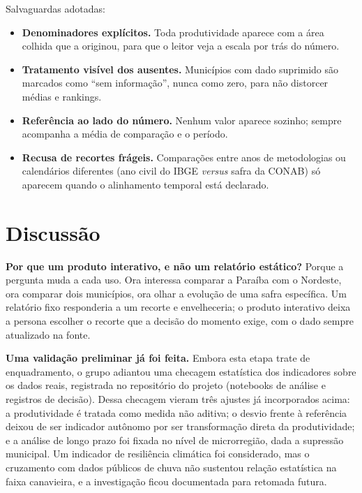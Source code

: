 \documentclass[11pt,a4paper]{article}
\begin{document}
Salvaguardas adotadas:
\begin{itemize}
  \item \textbf{Denominadores explícitos.} Toda produtividade aparece com a área colhida que a
  originou, para que o leitor veja a escala por trás do número.
  \item \textbf{Tratamento visível dos ausentes.} Municípios com dado suprimido são marcados
  como ``sem informação'', nunca como zero, para não distorcer médias e rankings.
  \item \textbf{Referência ao lado do número.} Nenhum valor aparece sozinho; sempre acompanha
  a média de comparação e o período.
  \item \textbf{Recusa de recortes frágeis.} Comparações entre anos de metodologias ou
  calendários diferentes (ano civil do IBGE \textit{versus} safra da CONAB) só aparecem quando
  o alinhamento temporal está declarado.
\end{itemize}

\section{Discussão}

\textbf{Por que um produto interativo, e não um relatório estático?} Porque a pergunta muda a
cada uso. Ora interessa comparar a Paraíba com o Nordeste, ora comparar dois municípios, ora
olhar a evolução de uma safra específica. Um relatório fixo responderia a um recorte e
envelheceria; o produto interativo deixa a persona escolher o recorte que a decisão do momento
exige, com o dado sempre atualizado na fonte.

\textbf{Uma validação preliminar já foi feita.} Embora esta etapa trate de enquadramento, o
grupo adiantou uma checagem estatística dos indicadores sobre os dados reais, registrada no
repositório do projeto (notebooks de análise e registros de decisão). Dessa checagem vieram
três ajustes já incorporados acima: a produtividade é tratada como medida não aditiva; o desvio
frente à referência deixou de ser indicador autônomo por ser transformação direta da
produtividade; e a análise de longo prazo foi fixada no nível de microrregião, dada a
supressão municipal. Um indicador de resiliência climática foi considerado, mas o cruzamento
com dados públicos de chuva não sustentou relação estatística na faixa canavieira, e a
investigação ficou documentada para retomada futura.
\end{document}
